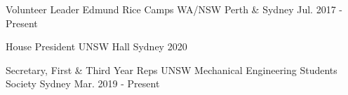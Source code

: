 

\begin{cventries}

  \cventry
    {Volunteer Leader} %
    {Edmund Rice Camps WA/NSW} %
    {Perth \& Sydney} %
    {Jul. 2017 - Present} %
    {}

  \cventry
    {House President} %
    {UNSW Hall} %
    {Sydney} %
    {2020} %
    {}
    
  \cventry
    {Secretary, First \& Third Year Reps} %
    {UNSW Mechanical Engineering Students Society} %
    {Sydney} %
    {Mar. 2019 - Present} %
    {}

\end{cventries}
